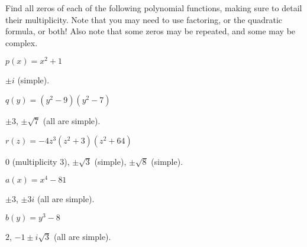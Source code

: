 \begin{exercises}
\begin{problem}
\begin{subproblem}
\begin{shortsolution}
	\end{shortsolution}
\end{subproblem}
\end{problem}
\begin{problem}[Zeros]
Find all zeros of each of the following polynomial functions, making 
sure to detail their multiplicity. Note that
you may need to use factoring, or the quadratic formula, or both! Also note 
that some zeros may be repeated, and some may be complex.
\begin{multicols}{3}
	\begin{subproblem}
		$p(x)=x^2+1$ 
		\begin{shortsolution}
			$\pm i$ (simple).
		\end{shortsolution}
	\end{subproblem}
	\begin{subproblem}
		$q(y)=(y^2-9)(y^2-7)$ 
		\begin{shortsolution}
			$\pm 3$, $\pm \sqrt{7}$ (all are simple).
		\end{shortsolution}
	\end{subproblem}
	\begin{subproblem}
		$r(z)=-4z^3(z^2+3)(z^2+64)$ 
		\begin{shortsolution}
			$0$ (multiplicity $3$), $\pm\sqrt{3}$ (simple), $\pm\sqrt{8}$ (simple).
		\end{shortsolution}
	\end{subproblem}
	\begin{subproblem}
		$a(x)=x^4-81$ 
		\begin{shortsolution}
			$\pm 3$, $\pm 3i$ (all are simple).
		\end{shortsolution}
	\end{subproblem}
	\begin{subproblem}
		$b(y)=y^3-8$ 
		\begin{shortsolution}
			$2$, $-1\pm i\sqrt{3}$ (all are simple).

\end{shortsolution}
\end{subproblem}
\end{multicols}
\end{problem}
\end{exercises}
